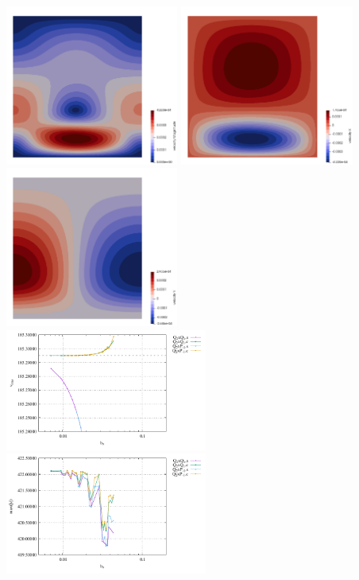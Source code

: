 \begin{center}
\includegraphics[width=5.7cm]{python_codes/fieldstone_25/newresults/isoviscous/vel}
\includegraphics[width=5.7cm]{python_codes/fieldstone_25/newresults/isoviscous/u}
\includegraphics[width=5.7cm]{python_codes/fieldstone_25/newresults/isoviscous/v}\\
\includegraphics[width=6.65cm]{python_codes/fieldstone_25/newresults/vrms_iso.pdf}
\includegraphics[width=6.65cm]{python_codes/fieldstone_25/newresults/max_vel_iso.pdf}\\

\end{center}
